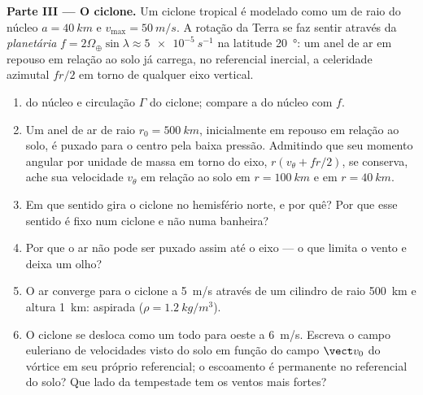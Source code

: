 \begin{problem}
\medskip
\noindent\textbf{Parte III --- O ciclone.}
Um ciclone tropical é modelado como um  de raio do núcleo
$a = \qty{40}{km}$ e $v_{\max} = \qty{50}{m/s}$. A rotação da Terra se
faz sentir através da \emph{ planetária} $f = 2\Omega_\oplus\sin\lambda
\approx \qty{5e-5}{s^{-1}}$ na latitude \qty{20}{\degree}: um anel de ar em
repouso em relação ao solo já carrega, no referencial inercial, a
celeridade azimutal $fr/2$ em torno de qualquer eixo vertical.
\begin{enumerate}[resume]
  \item {} do núcleo e circulação $\Gamma$ do ciclone;
        compare a  do núcleo com $f$.
  \item Um anel de ar de raio $r_0 = \qty{500}{km}$, inicialmente em repouso
        em relação ao solo, é puxado para o centro pela
        baixa pressão. Admitindo que seu momento angular por unidade de massa
        em torno do eixo, $r(v_\theta + fr/2)$, se conserva, ache sua
        velocidade $v_\theta$ em relação ao solo em $r = \qty{100}{km}$
        e em $r = \qty{40}{km}$.
  \item Em que sentido gira o ciclone no hemisfério norte, e
        por quê? Por que esse sentido é fixo num ciclone e
        não numa banheira?
  \item Por que o ar não pode ser puxado assim até o eixo ---
        o que limita o vento e deixa um olho?
  \item O ar converge para o ciclone a \qty{5}{m/s} através de um
        cilindro de raio \qty{500}{km} e altura \qty{1}{km}: 
        aspirada ($\rho = \qty{1.2}{kg/m^3}$).
  \item O ciclone se desloca como um todo para oeste a \qty{6}{m/s}. Escreva o
        campo euleriano de velocidades visto do solo em função do
        campo $\vect v_0$ do vórtice em seu próprio referencial; o escoamento é
        permanente no referencial do solo? Que lado da tempestade tem os
        ventos mais fortes?
\end{enumerate}


\end{problem}
